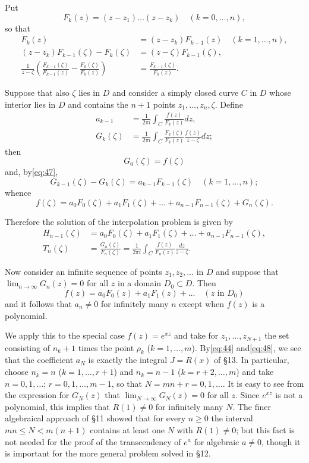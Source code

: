 Put
\[ F_k(z) = (z-z_1) \dots (z-z_k) \quad (k=0,\dots,n), \]
so that
\begin{equation} \begin{aligned} F_k(z) &= (z-z_k)F_{k-1}(z) \quad (k=1,\dots,n), \\ (z-z_k)F_{k-1}(\zeta) - F_k(\zeta) &= (z-\zeta)F_{k-1}(\zeta), \\ \frac{1}{z-\zeta} \left( \frac{F_{k-1}(\zeta)}{F_{k-1}(z)} - \frac{F_k(\zeta)}{F_k(z)} \right) &= \frac{F_{k-1}(\zeta)}{F_k(z)}. \end{aligned} \tag{47}\label{eq:47} \end{equation}

Suppose that also $\zeta$ lies in $D$ and consider a simply closed curve $C$ in $D$ whose interior lies in $D$ and contains the $n+1$ points $z_1, \ldots, z_n, \zeta$. Define
\begin{equation} \begin{aligned} a_{k-1} &= \frac{1}{2\pi i} \int_C \frac{f(z)}{F_k(z)} dz, \\ G_k(\zeta) &= \frac{1}{2\pi i} \int_C \frac{F_k(\zeta)}{F_k(z)} \frac{f(z)}{z-\zeta} dz; \end{aligned} \tag{48}\label{eq:48} \end{equation}
then
\[ G_0(\zeta) = f(\zeta) \]
and, by\eqref{eq:47},
\[ G_{k-1}(\zeta) - G_k(\zeta) = a_{k-1}F_{k-1}(\zeta) \quad (k=1,\dots,n); \]
whence
\[ f(\zeta) = a_0 F_0(\zeta) + a_1 F_1(\zeta) + \dots + a_{n-1} F_{n-1}(\zeta) + G_n(\zeta). \]

Therefore the solution of the interpolation problem is given by
\[ \begin{aligned} H_{n-1}(\zeta) &= a_0 F_0(\zeta) + a_1 F_1(\zeta) + \dots + a_{n-1} F_{n-1}(\zeta), \\ T_n(\zeta) &= \frac{G_n(\zeta)}{F_n(\zeta)} = \frac{1}{2\pi i} \int_C \frac{f(z)}{F_n(z)} \frac{dz}{z - \zeta}. \end{aligned} \]

Now consider an infinite sequence of points $z_1, z_2, \dots$ in $D$ and suppose that $\lim_{n \to \infty} G_n(z) = 0$ for all $z$ in a domain $D_0 \subset D$. Then
\[ f(z) = a_0 F_0(z) + a_1 F_1(z) + \dots \quad (z \text{ in } D_0) \]
and it follows that $a_n \neq 0$ for infinitely many $n$ except when $f(z)$ is a polynomial.

We apply this to the special case $f(z) = e^{xz}$ and take for $z_1, \dots, z_{N+1}$ the set consisting of $n_k+1$ times the point $\rho_k$ ($k=1,\dots,m$). By\eqref{eq:44} and\eqref{eq:48}, we see that the coefficient $a_N$ is exactly the integral $J = R(x)$ of \S 13. In particular, choose $n_k = n$ ($k=1,\dots,r+1$) and $n_k = n-1$ ($k=r+2,\dots,m$) and take $n = 0, 1, \dots$; $r = 0, 1, \dots, m-1$, so that $N = mn+r = 0, 1, \dots$. It is easy to see from the expression for $G_N(z)$ that $\lim_{N \to \infty} G_N(z) = 0$ for all $z$. Since $e^{xz}$ is not a polynomial, this implies that $R(1) \neq 0$ for infinitely many $N$. The finer algebraical approach of \S 11 showed that for every $n \geq 0$ the interval $mn \leq N < m(n+1)$ contains at least one $N$ with $R(1) \neq 0$; but this fact is not needed for the proof of the transcendency of $e^a$ for algebraic $a \neq 0$, though it is important for the more general problem solved in \S 12.

